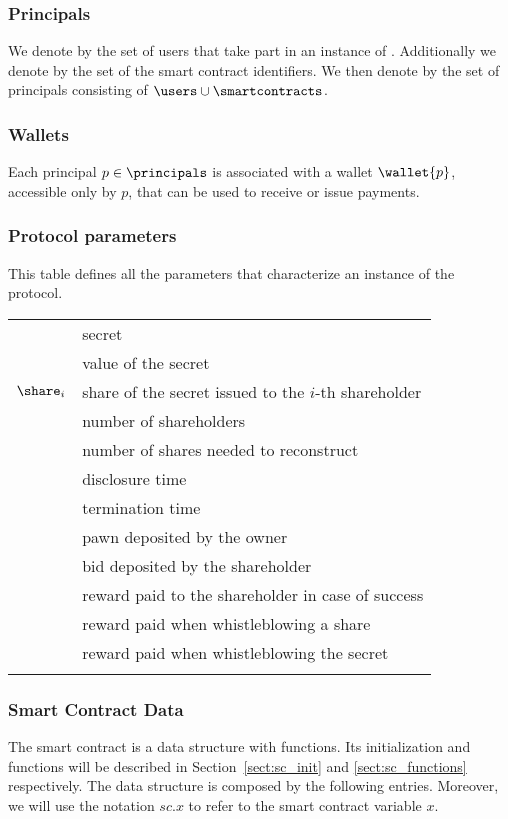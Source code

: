 \subsubsection*{Principals}
We denote by \users the set of users that take part in an instance of \shortname.
Additionally we denote by \smartcontracts the set of the smart contract identifiers.
We then denote by \principals the set of principals consisting of $\users \cup \smartcontracts$.

\medskip

\subsubsection*{Wallets}
Each principal $p \in \principals$ is associated with a wallet $\wallet{p}$, accessible only by $p$, that can be used to receive or issue payments.

\medskip

\subsubsection*{Protocol parameters}
This table defines all the parameters that characterize an instance of the \shortname protocol. \\

\begin{tabular}{ll}
	\secret & secret \\
	\V & value of the secret \\
	$\share_{i}$ & share of the secret issued to the $i$-th shareholder \\
	\N & number of shareholders \\
	\K & number of shares needed to reconstruct \secret \\	
	\td & disclosure time \\
	\te & termination time \\
	\PO & pawn deposited by the owner \\
	\BH & bid deposited by the shareholder \\
	\RH & reward paid to the shareholder in case of success \\
	\Wshare & reward paid when whistleblowing a share \\
	\Wsecret & reward paid when whistleblowing the secret \\

	& \\
\end{tabular}

\subsubsection*{Smart Contract Data}
The \shortname smart contract is a data structure with functions. 
Its initialization and functions will be described in Section~\ref{sect:sc_init} and \ref{sect:sc_functions} respectively. The data structure is composed by the following entries.
Moreover, we will use the notation $sc.x$ to refer to the smart contract variable $x$.


